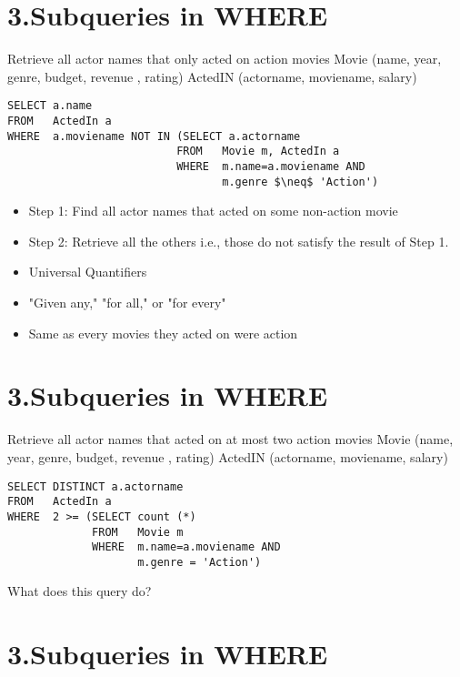 \documentclass{article}
\begin{document}
\section*{3.Subqueries in WHERE}

Retrieve all actor names that only acted on action movies Movie (name, year, genre, budget, revenue , rating) ActedIN (actorname, moviename, salary)

\begin{verbatim}
SELECT a.name
FROM   ActedIn a
WHERE  a.moviename NOT IN (SELECT a.actorname
                          FROM   Movie m, ActedIn a
                          WHERE  m.name=a.moviename AND
                                 m.genre $\neq$ 'Action')
\end{verbatim}

\begin{itemize}
\item Step 1: Find all actor names that acted on some non-action movie
\item Step 2: Retrieve all the others i.e., those do not satisfy the result of Step 1.
\end{itemize}


\begin{itemize}
\item Universal Quantifiers
\item "Given any," "for all," or "for every"
\item Same as every movies they acted on were action
\end{itemize}

\section*{3.Subqueries in WHERE}

Retrieve all actor names that acted on at most two action movies Movie (name, year, genre, budget, revenue , rating) ActedIN (actorname, moviename, salary)

\begin{verbatim}
SELECT DISTINCT a.actorname
FROM   ActedIn a
WHERE  2 >= (SELECT count (*)
             FROM   Movie m
             WHERE  m.name=a.moviename AND
                    m.genre = 'Action')
\end{verbatim}

What does this query do?

\section*{3.Subqueries in WHERE}
\end{document}
